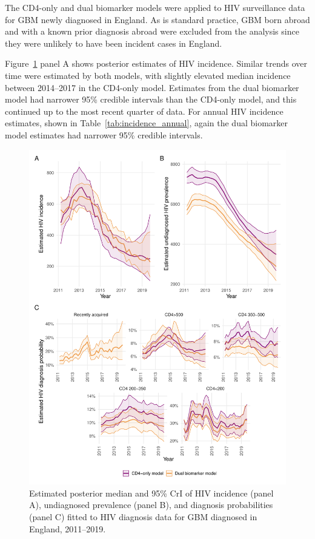 The CD4-only and dual biomarker models were applied to HIV surveillance data for GBM newly diagnosed in England. As is standard practice, GBM born abroad and with a known prior diagnosis abroad were excluded from the analysis since they were unlikely to have been incident cases in England.

Figure~\ref{fig:rita_estimates} panel A shows posterior estimates of HIV incidence. Similar trends over time were estimated by both models, with slightly elevated median incidence between 2014--2017 in the CD4-only model. Estimates from the dual biomarker model had narrower 95\% credible intervals than the CD4-only model, and this continued up to the most recent quarter of data. For annual HIV incidence estimates, shown in Table~\ref{tab:incidence_annual}, again the dual biomarker model estimates had narrower 95\% credible intervals.



\begin{figure}[htbp!]
  \centering
  \includegraphics[width=\textwidth]{rita_estimates.pdf}
  \caption[Estimated posterior median and 95\% CrI of HIV incidence, undiagnosed prevalence, and diagnosis probabilities for GBM diagnosed in England, 2011--2019]{Estimated posterior median and 95\% CrI of HIV incidence (panel A), undiagnosed prevalence (panel B), and diagnosis probabilities (panel C) fitted to HIV diagnosis data for GBM diagnosed in England, 2011--2019.}\label{fig:rita_estimates}
\end{figure}

